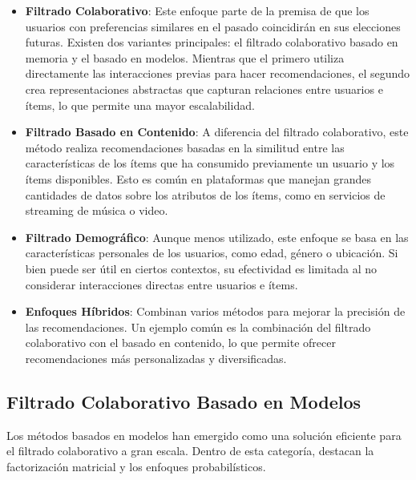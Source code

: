 \documentclass[runningheads,a4paper]{llncs}
\begin{document}
\begin{itemize}
    \item \textbf{Filtrado Colaborativo}: 
    Este enfoque parte de la premisa de que los 
    usuarios con preferencias similares en el pasado 
    coincidirán en sus elecciones futuras. Existen dos 
    variantes principales: el filtrado colaborativo 
    basado en memoria y el basado en modelos. Mientras 
    que el primero utiliza directamente las 
    interacciones previas para hacer recomendaciones, 
    el segundo crea representaciones abstractas que 
    capturan relaciones entre usuarios e ítems, lo que 
    permite una mayor escalabilidad. \cite{estado_arte_sistemas_recomendacion}
    
    \item \textbf{Filtrado Basado en Contenido}: A diferencia del filtrado colaborativo, este método realiza recomendaciones basadas en la similitud entre las características de los ítems que ha consumido previamente un usuario y los ítems disponibles. Esto es común en plataformas que manejan grandes cantidades de datos sobre los atributos de los ítems, como en servicios de streaming de música o video.\cite{estado_arte_sistemas_recomendacion}

    \item \textbf{Filtrado Demográfico}: Aunque menos utilizado, este enfoque se basa en las características personales de los usuarios, como edad, género o ubicación. Si bien puede ser útil en ciertos contextos, su efectividad es limitada al no considerar interacciones directas entre usuarios e ítems.\cite{estado_arte_sistemas_recomendacion}

    \item \textbf{Enfoques Híbridos}: Combinan varios métodos para mejorar la precisión de las recomendaciones. Un ejemplo común es la combinación del filtrado colaborativo con el basado en contenido, lo que permite ofrecer recomendaciones más personalizadas y diversificadas.\cite{estado_arte_sistemas_recomendacion}
\end{itemize}

\subsection{Filtrado Colaborativo Basado en Modelos}

Los métodos basados en modelos han emergido como una solución eficiente para el filtrado colaborativo a gran escala. Dentro de esta categoría, destacan la factorización matricial y los enfoques probabilísticos.
\end{document}
